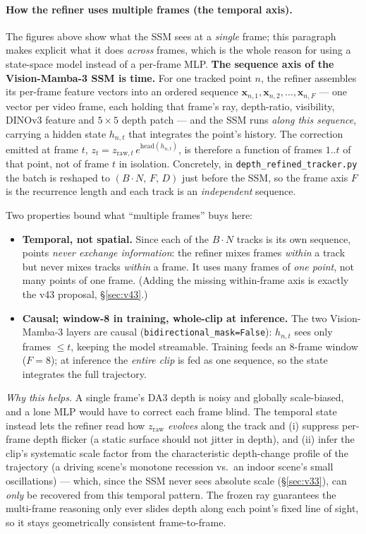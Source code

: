 \documentclass[11pt,a4paper]{article}
\begin{document}
\paragraph{How the refiner uses multiple frames (the temporal axis).}
The figures above show what the SSM sees at a \emph{single} frame; this paragraph makes explicit what it
does \emph{across} frames, which is the whole reason for using a state-space model instead of a per-frame
MLP. \textbf{The sequence axis of the Vision-Mamba-3 SSM is time.} For one tracked point $n$, the refiner
assembles its per-frame feature vectors into an ordered sequence
$\mathbf{x}_{n,1},\mathbf{x}_{n,2},\dots,\mathbf{x}_{n,F}$ --- one vector per video frame, each holding
that frame's ray, depth-ratio, visibility, DINOv3 feature and $5{\times}5$ depth patch --- and the SSM
runs \emph{along this sequence}, carrying a hidden state $h_{n,t}$ that integrates the point's history.
The correction emitted at frame $t$, $z_{t}=z_{\text{raw},t}\,e^{\mathrm{head}(h_{n,t})}$, is therefore a
function of frames $1..t$ of that point, not of frame $t$ in isolation. Concretely, in
\texttt{depth\_refined\_tracker.py} the batch is reshaped to $(B\!\cdot\!N,\,F,\,D)$ just before the SSM,
so the frame axis $F$ is the recurrence length and each track is an \emph{independent} sequence.

Two properties bound what ``multiple frames'' buys here:
\begin{itemize}
  \item \textbf{Temporal, not spatial.} Since each of the $B\!\cdot\!N$ tracks is its own sequence, points
  \emph{never exchange information}: the refiner mixes frames \emph{within} a track but never mixes tracks
  \emph{within} a frame. It uses many frames of \emph{one point}, not many points of one frame. (Adding
  the missing within-frame axis is exactly the v43 proposal, \S\ref{sec:v43}.)
  \item \textbf{Causal; window-8 in training, whole-clip at inference.} The two Vision-Mamba-3 layers are causal
  (\texttt{bidirectional\_mask=False}): $h_{n,t}$ sees only frames $\le t$, keeping the model streamable.
  Training feeds an $8$-frame window ($F{=}8$); at inference the \emph{entire clip} is fed as one
  sequence, so the state integrates the full trajectory.
\end{itemize}

\emph{Why this helps.} A single frame's DA3 depth is noisy and globally scale-biased, and a lone MLP would
have to correct each frame blind. The temporal state instead lets the refiner read how $z_{\text{raw}}$
\emph{evolves} along the track and (i) suppress per-frame depth flicker (a static surface should not
jitter in depth), and (ii) infer the clip's systematic scale factor from the characteristic depth-change
profile of the trajectory (a driving scene's monotone recession vs.\ an indoor scene's small
oscillations) --- which, since the SSM never sees absolute scale (\S\ref{sec:v33}), can \emph{only} be
recovered from this temporal pattern. The frozen ray guarantees the multi-frame reasoning only ever slides
depth along each point's fixed line of sight, so it stays geometrically consistent frame-to-frame.
\end{document}
